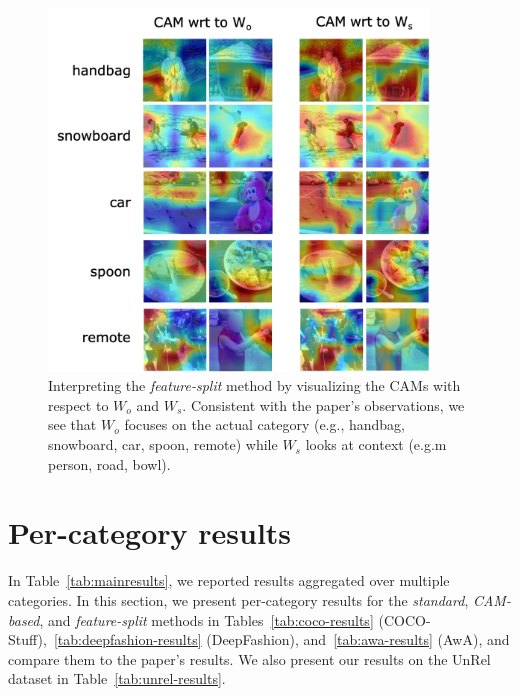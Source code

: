 \begin{figure}[h!]
    \centering
    \includegraphics[width=0.9\textwidth]{../openreview/images/featuresplit-comparisons.png}
    \caption{Interpreting the \textit{feature-split} method by visualizing the CAMs with respect to $W_o$ and $W_s$. Consistent with the paper's observations, we see that $W_o$ focuses on the actual category (e.g., handbag, snowboard, car, spoon, remote) while $W_s$ looks at context (e.g.m person, road, bowl).}
    \label{fig:featuresplit-comparisons}
\end{figure}



\clearpage
\section{Per-category results}
\label{sec:percategory}

In Table~\ref{tab:mainresults}, we reported results aggregated over multiple categories. In this section, we present per-category results for the \textit{standard}, \textit{CAM-based}, and \textit{feature-split} methods in Tables~\ref{tab:coco-results} (COCO-Stuff),~\ref{tab:deepfashion-results} (DeepFashion), and~\ref{tab:awa-results} (AwA), and compare them to the paper's results. We also present our results on the UnRel dataset in Table~\ref{tab:unrel-results}.

